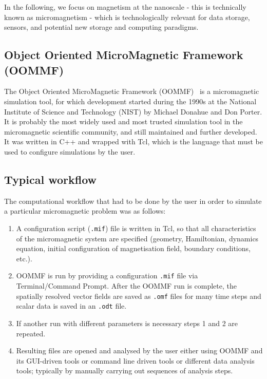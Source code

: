 \documentclass{deliverablereport}
\begin{document}
In the following, we focus on magnetism at the nanoscale -
this is technically known as micromagnetism - which is technologically
relevant for data storage, sensors, and potential new storage and
computing paradigms.



\subsection{Object Oriented MicroMagnetic Framework (OOMMF)}

The Object Oriented MicroMagnetic Framework (OOMMF)~\cite{Donahue1999}
is a micromagnetic simulation tool, for which development started
during the 1990s at the National Institute of Science and Technology
(NIST) by Michael Donahue and Don Porter. It is probably the most
widely used and most trusted simulation tool in the micromagnetic
scientific community, and still maintained and further developed. It
was written in C++ and wrapped with Tcl, which is the language that
must be used to configure simulations by the user.

\subsection{Typical workflow}



The computational workflow that had to be done by the user in order to simulate a
particular micromagnetic problem was as follows:

\begin{enumerate}
\item A configuration script (\texttt{.mif}) file is written in Tcl,
  so that all characteristics of the micromagnetic system are
  specified (geometry, Hamiltonian, dynamics equation, initial
  configuration of magnetisation field, boundary conditions, etc.).
\item OOMMF is run by providing a configuration \texttt{.mif} file via
  Terminal/Command Prompt. After the OOMMF run is complete, the
  spatially resolved vector fields are saved as \texttt{.omf} files
  for many time steps and scalar data is saved in an \texttt{.odt}
  file.
\item If another run with different parameters is necessary steps 1
  and 2 are repeated.
\item Resulting files are opened and analysed by the user either using
  OOMMF and its GUI-driven tools or command line driven tools or
  different data analysis tools; typically by manually carrying out
  sequences of analysis steps.
\end{enumerate}
\end{document}
